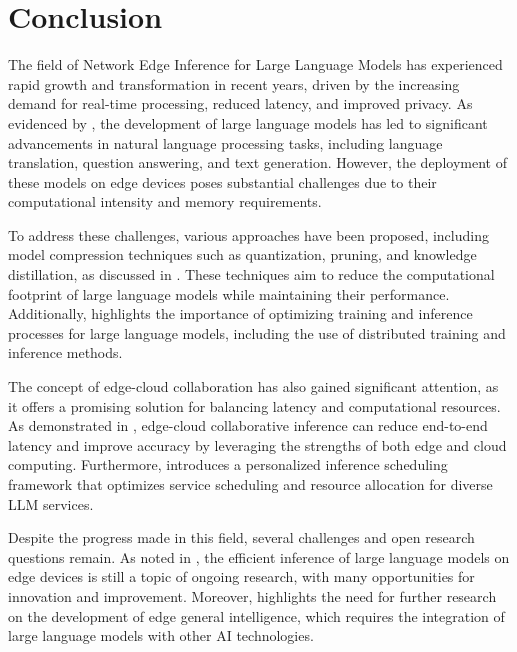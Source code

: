 \documentclass[11pt,a4paper]{article}
\begin{document}
\section{Conclusion}


The field of Network Edge Inference for Large Language Models has experienced rapid growth and transformation in recent years, driven by the increasing demand for real-time processing, reduced latency, and improved privacy. As evidenced by \cite{arxiv:2402.06196}, the development of large language models has led to significant advancements in natural language processing tasks, including language translation, question answering, and text generation. However, the deployment of these models on edge devices poses substantial challenges due to their computational intensity and memory requirements.

To address these challenges, various approaches have been proposed, including model compression techniques such as quantization, pruning, and knowledge distillation, as discussed in \cite{doi:10.1609/aaai.v37i9.26255}. These techniques aim to reduce the computational footprint of large language models while maintaining their performance. Additionally, \cite{doi:10.1109/access.2024.3501358} highlights the importance of optimizing training and inference processes for large language models, including the use of distributed training and inference methods.

The concept of edge-cloud collaboration has also gained significant attention, as it offers a promising solution for balancing latency and computational resources. As demonstrated in \cite{doi:10.3390/electronics12173598}, edge-cloud collaborative inference can reduce end-to-end latency and improve accuracy by leveraging the strengths of both edge and cloud computing. Furthermore, \cite{arxiv:2405.14636} introduces a personalized inference scheduling framework that optimizes service scheduling and resource allocation for diverse LLM services.

Despite the progress made in this field, several challenges and open research questions remain. As noted in \cite{arxiv:2404.14294}, the efficient inference of large language models on edge devices is still a topic of ongoing research, with many opportunities for innovation and improvement. Moreover, \cite{doi:10.1109/mnet.2025.3539338} highlights the need for further research on the development of edge general intelligence, which requires the integration of large language models with other AI technologies.
\end{document}
